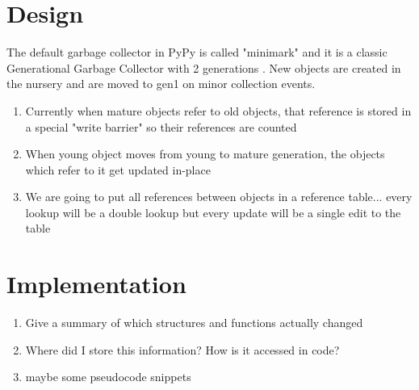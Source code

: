\documentclass{article}
\begin{document}
\section{Design}

The default garbage collector in PyPy is called "minimark" and it is a classic Generational Garbage Collector with 2 generations \cite{pypy-doc}.  New objects are created in the nursery and are moved to gen1 on minor collection events.  

\begin{enumerate}
	\item Currently when mature objects refer to old objects, that reference is stored in a special "write barrier" so their references are counted
    \item When young object moves from young to mature generation, the objects which refer to it get updated in-place
    \item We are going to put all references between objects in a reference table... every lookup will be a double lookup but every update will be a single edit to the table
\end{enumerate}

\section{Implementation}
\begin{enumerate}
	\item Give a summary of which structures and functions actually changed
    \item Where did I store this information?  How is it accessed in code?  
    \item maybe some pseudocode snippets
\end{enumerate}
\end{document}
